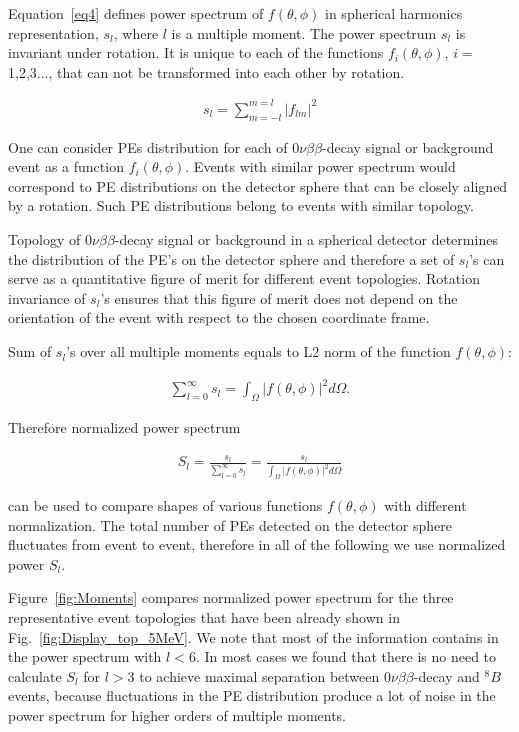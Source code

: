 \documentclass[12pt,twoside,letterpaper]{article}
\newcommand{\vbb}{0\nu\beta\beta}
\newcommand{\B}{^{8}B}
\begin{document}
Equation~\ref{eq4} defines power spectrum of $f(\theta,\phi)$ in spherical harmonics representation, $s_l$, where $l$ is a multiple moment. The power spectrum $s_l$ is invariant under rotation. It is unique to each of the functions $f_i(\theta,\phi)$, $i=$1,2,3..., that can not be transformed into each other by rotation.

\begin{eqnarray}
\label{eq4}
s_l = \sum_{m=-l}^{m=l} |f_{lm}|^2
\end{eqnarray}

One can consider PEs distribution for each of $\vbb$-decay signal or background event as a function $f_i(\theta,\phi)$. Events with similar power spectrum would correspond to PE distributions on the detector sphere that can be closely aligned by a rotation. Such PE distributions belong to events with similar topology.

Topology of $\vbb$-decay signal or background in a spherical detector determines the distribution of the PE's on the detector sphere and therefore a set of $s_l$'s can serve as a quantitative figure of merit for different event topologies. Rotation invariance of $s_l$'s ensures that this figure of merit does not depend on the orientation of the event with respect to the chosen coordinate frame.


Sum of $s_l$'s over all multiple moments equals to L2 norm of the function $f(\theta,\phi)$:

\begin{eqnarray}
\label{eq5}
\sum_{l=0}^{\infty} s_l = \int_{\Omega} |f(\theta,\phi)|^2 d\Omega.
\end{eqnarray}

Therefore normalized power spectrum 

\begin{eqnarray}
\label{eq5}
S_l = \frac{s_l}{\sum_{l=0}^{\infty} s_l} =  \frac{s_l}{\int_{\Omega} |f(\theta,\phi)|^2 d\Omega}
\end{eqnarray}

can be used to compare shapes of various functions $f(\theta,\phi)$ with different normalization. The total number of PEs detected on the detector sphere fluctuates from event to event, therefore in all of the following we use normalized power $S_l$.

Figure~\ref{fig:Moments} compares normalized power spectrum for the three representative event topologies that have been already shown in Fig.~\ref{fig:Display_top_5MeV}. We note that most of the information contains in the power spectrum with $l<$6. In most cases we found that there is no need to calculate $S_l$ for $l>$3 to achieve maximal separation between $\vbb$-decay and $\B$ events, because fluctuations in the PE distribution produce a lot of noise in the power spectrum for higher orders of multiple moments.
\end{document}
